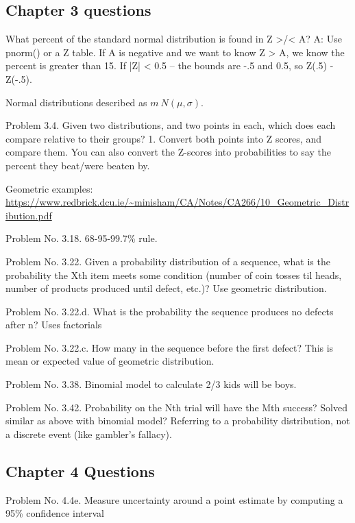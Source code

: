 \hformbar

\subsection{Chapter 3 questions}

What percent of the standard normal distribution is found in Z >/< A? A: Use pnorm() or a Z table. If A is negative and we want to know Z > A, we know the percent is greater than 15. If |Z| < 0.5 -- the bounds are -.5 and 0.5, so Z(.5) - Z(-.5).

Normal distributions described as $m ~ N(\mu, \sigma)$.

Problem 3.4. Given two distributions, and two points in each, which does each compare relative to their groups? 1. Convert both points into Z scores, and compare them. You can also convert the Z-scores into probabilities to say the percent they beat/were beaten by.

Geometric examples: \url{https://www.redbrick.dcu.ie/~minisham/CA/Notes/CA266/10_Geometric_Distribution.pdf}

Problem No. 3.18. 68-95-99.7\% rule.

Problem No. 3.22. Given a probability distribution of a sequence, what is the probability the Xth item meets some condition (number of coin tosses til heads, number of products produced until defect, etc.)? Use geometric distribution.

Problem No. 3.22.d. What is the probability the sequence produces no defects after n? Uses factorials

Problem No. 3.22.c. How many in the sequence before the first defect? This is mean or expected value of geometric distribution.

Problem No. 3.38. Binomial model to calculate 2/3 kids will be boys.

Problem No. 3.42. Probability on the Nth trial will have the Mth success? Solved similar as above with binomial model? Referring to a probability distribution, not a discrete event (like gambler's fallacy).



\subsection{Chapter 4 Questions}

Problem No. 4.4e. Measure uncertainty around a point estimate by computing a 95\% confidence interval


\newpage
